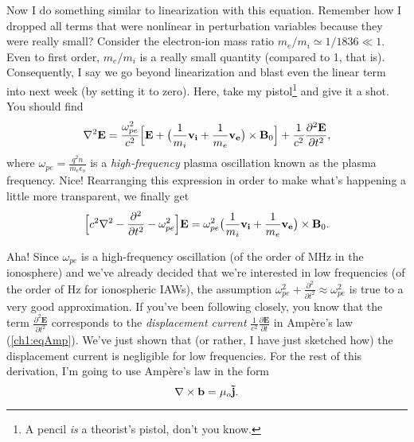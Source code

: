 Now I do something similar to linearization with this equation. Remember how I
dropped all terms that were nonlinear in perturbation variables because they
were really small? Consider the electron-ion mass ratio
$m_e / m_i \simeq 1 / 1836 \ll 1$. Even to first order, $m_e / m_i$ is a really
small quantity (compared to 1, that is). Consequently, I say we go beyond
linearization and blast even the linear term into next week (by setting it to
zero). Here, take my pistol\footnote{A pencil \emph{is} a theorist's pistol,
  don't you know.} and give it a shot. You should find
\begin{equation} {\bf \nabla}^2 \mathbf{E} = \dfrac{\omega_{pe}^2}{c^2} \Big [
  \mathbf{E} + \big ( \dfrac{1}{m_i} \mathbf{v_i} + \dfrac{1}{m_e} \mathbf{v_e}
  \big ) \times \mathbf{B}_0 \Big ] + \dfrac{1}{c^2} \dfrac{\partial^2
    \mathbf{E}}{\partial t^2},
\end{equation} 
where $\omega_{pe} = \frac{q^2 n}{m_e \epsilon_o}$ is a \emph{high-frequency}
plasma oscillation known as the plasma frequency. Nice!  Rearranging this
expression in order to make what's happening a little more transparent, we finally get
\begin{equation} \Big [ c^2 {\bf \nabla}^2 - \dfrac{\partial^2}{\partial t^2} -
  \omega_{pe}^2 \Big ] \mathbf{E} = \omega_{pe}^2 \big ( \dfrac{1}{m_i}
  \mathbf{v_i} + \dfrac{1}{m_e} \mathbf{v_e} \big ) \times \mathbf{B}_0.
\end{equation} 

Aha! Since $\omega_{pe}$ is a high-frequency oscillation (of the order of MHz in
the ionosphere) and we've already decided that we're interested in low
frequencies (of the order of Hz for ionospheric IAWs), the assumption
$\omega_{pe}^2 + \frac{\partial^2}{\partial t^2} \approx \omega_{pe}^2$ is true
to a very good approximation. If you've been following closely, you know that
the term $\frac{\partial^2 \mathbf{E}}{\partial t^2}$ corresponds to the
\emph{displacement current} $\frac{1}{c^2} \frac{\partial \mathbf{E}}{\partial t}$ in
Amp\`{e}re's law (\ref{ch1:eqAmp}). We've just shown that (or rather, I have
just sketched how) the displacement current is negligible for low
frequencies. For the rest of this derivation, I'm going to use Amp\`{e}re's law
in the form
\begin{equation}
  {\bf \nabla} \times \mathbf{b} = \mu_o \mathbf{\tilde j}.
\end{equation}


